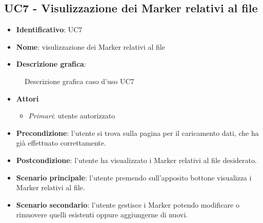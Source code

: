
\subsection{UC7 - Visulizzazione dei Marker relativi al file}
\begin{itemize}
  \item \textbf{Identificativo}: UC7
  \item \textbf{Nome}: visulizzazione dei Marker relativi al file
  \item \textbf{Descrizione grafica}:
\end{itemize}

\begin{figure}[h]
  \centering
  \caption{Descrizione grafica caso d'uso UC7}
\end{figure}

\begin{itemize}
  \item \textbf{Attori}
        \begin{itemize}
          \item \textit{Primari}: utente autorizzato
        \end{itemize}
  \item \textbf{Precondizione}: l'utente si trova sulla pagina per il caricamento dati, che ha già effettuato correttamente.
  \item \textbf{Postcondizione}: l'utente ha visualizzato i Marker relativi al file desiderato.
  \item \textbf{Scenario principale}: l'utente premendo sull'apposito bottone visualizza i Marker relativi al file.
  \item \textbf{Scenario secondario}: l'utente gestisce i Marker potendo modificare o rimuovere quelli esistenti oppure aggiungerne di nuovi.
\end{itemize}
\newpage



